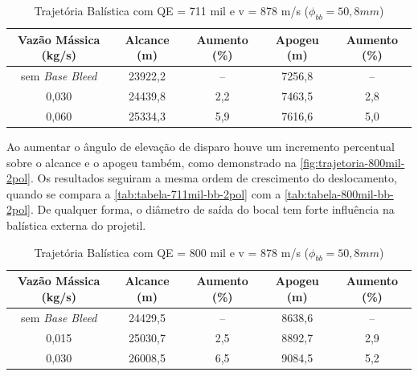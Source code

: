 \begin{table}[ht]
\centering
\caption[Trajetória Balística com QE = 711 mil e v = 878 m/s ($\phi_{bb} = 50,8\unit{mm}$]{Trajetória Balística com QE = 711 mil e v = 878 m/s ($\phi_{bb} = 50,8\unit{mm}$)}
\vspace{0.5cm}
\begin{tabular}{c|c|c|c|c}
Vazão Mássica (kg/s) & Alcance (m) & Aumento (\%) & Apogeu (m) & Aumento (\%) \\
\hline
sem \textit{Base Bleed} & 23922,2 & -- & 7256,8 & -- \\ 
0,030 & 24439,8 & 2,2 & 7463,5 & 2,8 \\
0,060 & 25334,3 & 5,9 & 7616,6 & 5,0
\end{tabular}
\label{tab:tabela-711mil-bb-2pol}
\end{table}

Ao aumentar o ângulo de elevação de disparo houve um incremento percentual sobre o alcance e o apogeu também, como demonstrado na \autoref{fig:trajetoria-800mil-2pol}. Os resultados seguiram a mesma ordem de crescimento do deslocamento, quando se compara a \autoref{tab:tabela-711mil-bb-2pol} com a \autoref{tab:tabela-800mil-bb-2pol}. De qualquer forma, o diâmetro de saída do bocal tem forte influência na balística externa do projetil.

\begin{table}[ht]
\centering
\caption[Trajetória Balística com QE = 800 mil e v = 878 m/s ($\phi_{bb} = 50,8\unit{mm}$]{Trajetória Balística com QE = 800 mil e v = 878 m/s ($\phi_{bb} = 50,8\unit{mm}$)}
\vspace{0.5cm}
\begin{tabular}{c|c|c|c|c}
Vazão Mássica (kg/s) & Alcance (m) & Aumento (\%) & Apogeu (m) & Aumento (\%) \\
\hline
sem \textit{Base Bleed} & 24429,5 & -- & 8638,6 & -- \\ 
0,015 & 25030,7 & 2,5 & 8892,7 & 2,9 \\
0,030 & 26008,5 & 6,5 & 9084,5 & 5,2
\end{tabular}
\label{tab:tabela-800mil-bb-2pol}
\end{table}